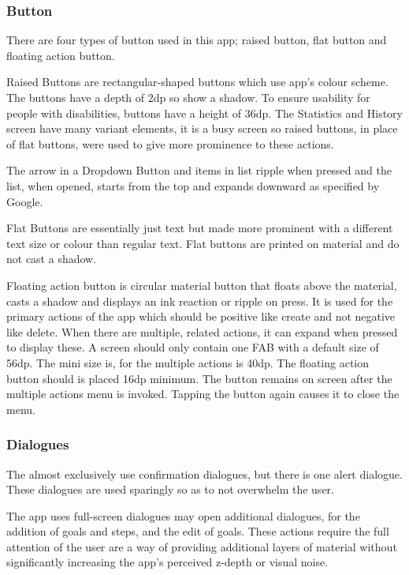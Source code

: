 \documentclass[12pt]{report}
\begin{document}
\subsubsection{Button}
There are four types of button used in this app; raised button, flat button and floating action button.
\newline

Raised Buttons are rectangular-shaped buttons which use app’s colour scheme. The buttons have a depth of 2dp so show a shadow. To ensure usability for people with disabilities, buttons have a height of 36dp.
The Statistics and History screen have many variant elements, it is a busy screen so raised buttons, in place of flat buttons, were used to give more prominence to these actions. 
\newline

The arrow in a Dropdown Button and items in list ripple when pressed and the list, when opened, starts from the top and expands downward as specified by Google.\newline


Flat Buttons are essentially just text but made more prominent with a different text size or colour than regular text. Flat buttons are printed on material and do not cast a shadow. \newline


Floating action button is circular material button that floats above the material, casts a shadow and displays an ink reaction or ripple on press. It is used for the primary actions of the app which should be positive like create and not negative like delete. 
When there are multiple, related actions, it can expand when pressed to display these. A screen should only contain one FAB with a default size of 56dp. The mini size is, for the multiple actions is 40dp. The floating action button should is placed 16dp minimum. The button remains on screen after the multiple actions menu is invoked. Tapping the button again causes it to close the menu.

\subsubsection{Dialogues}

The almost exclusively use confirmation dialogues, but there is one alert dialogue. These dialogues are used sparingly so as to not overwhelm the user.

The app uses full-screen dialogues may open additional dialogues, for the addition of goals and steps, and the edit of goals. These actions require the full attention of the user are a way of providing additional layers of material without significantly increasing the app’s perceived z-depth or visual noise.
\end{document}
